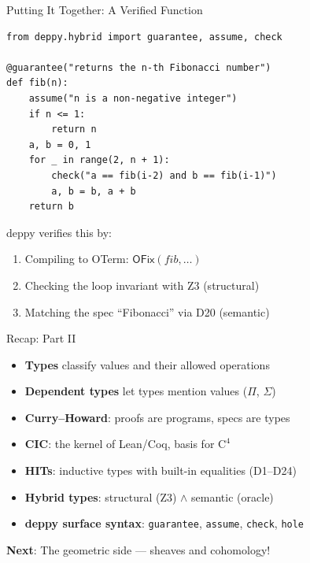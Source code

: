 \documentclass[aspectratio=169,11pt]{beamer}
\newcommand{\Cfour}{\mathrm{C}^4}
\begin{document}
\begin{frame}[fragile]{Putting It Together: A Verified Function}
\begin{lstlisting}[language=deppy]
from deppy.hybrid import guarantee, assume, check

@guarantee("returns the n-th Fibonacci number")
def fib(n):
    assume("n is a non-negative integer")
    if n <= 1:
        return n
    a, b = 0, 1
    for _ in range(2, n + 1):
        check("a == fib(i-2) and b == fib(i-1)")
        a, b = b, a + b
    return b
\end{lstlisting}

\vspace{0.5em}
deppy verifies this by:
\begin{enumerate}
\item Compiling to OTerm: $\mathsf{OFix}(\mathit{fib}, \ldots)$
\item Checking the loop invariant with Z3 (structural)
\item Matching the spec ``Fibonacci'' via D20 (semantic)
\end{enumerate}
\end{frame}

\begin{frame}{Recap: Part II}
\begin{itemize}
\item \textbf{Types} classify values and their allowed operations
\item \textbf{Dependent types} let types mention values ($\Pi$, $\Sigma$)
\item \textbf{Curry--Howard}: proofs are programs, specs are types
\item \textbf{CIC}: the kernel of Lean/Coq, basis for $\Cfour$
\item \textbf{HITs}: inductive types with built-in equalities (D1--D24)
\item \textbf{Hybrid types}: structural (Z3) $\wedge$ semantic (oracle)
\item \textbf{deppy surface syntax}: \texttt{guarantee}, \texttt{assume},
  \texttt{check}, \texttt{hole}
\end{itemize}

\vspace{0.5em}
\begin{center}
\textbf{Next}: The geometric side --- sheaves and cohomology!
\end{center}
\end{frame}

\end{document}
